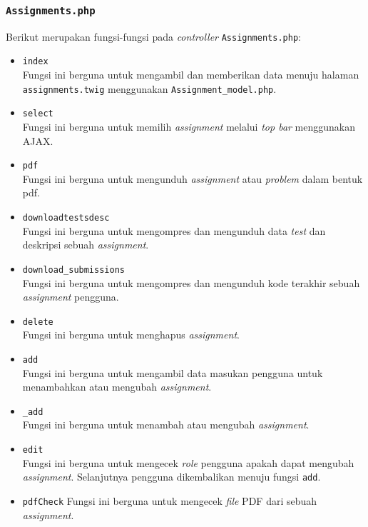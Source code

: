 \subsubsection{\texttt{Assignments.php}}
Berikut merupakan fungsi-fungsi pada \textit{controller} \texttt{Assignments.php}:
\begin{itemize}
	\item \texttt{index}\\
	Fungsi ini berguna untuk mengambil dan memberikan data menuju halaman \texttt{assignments.twig} menggunakan \texttt{Assignment\_model.php}.
	\item \texttt{select}\\
	Fungsi ini berguna untuk memilih \textit{assignment} melalui \textit{top bar} menggunakan AJAX.
	\item \texttt{pdf}\\
	Fungsi ini berguna untuk mengunduh \textit{assignment} atau \textit{problem} dalam bentuk pdf.
	\item \texttt{downloadtestsdesc}\\
	Fungsi ini berguna untuk mengompres dan mengunduh data \textit{test} dan deskripsi sebuah \textit{assignment}.
	\item \texttt{download\_submissions}\\
	Fungsi ini berguna untuk mengompres dan mengunduh kode terakhir sebuah \textit{assignment} pengguna.
	\item \texttt{delete}\\
	Fungsi ini berguna untuk menghapus \textit{assignment}.
	\item \texttt{add}\\
	Fungsi ini berguna untuk mengambil data masukan pengguna untuk menambahkan atau mengubah \textit{assignment}.
	\item \texttt{\_add}\\
	Fungsi ini berguna untuk menambah atau mengubah \textit{assignment}.
	\item \texttt{edit}\\
	Fungsi ini berguna untuk mengecek \textit{role} pengguna apakah dapat mengubah \textit{assignment}. Selanjutnya pengguna dikembalikan menuju fungsi \texttt{add}. 
	\item \texttt{pdfCheck}
	Fungsi ini berguna untuk mengecek \textit{file} PDF dari sebuah \textit{assignment}.
\end{itemize}


